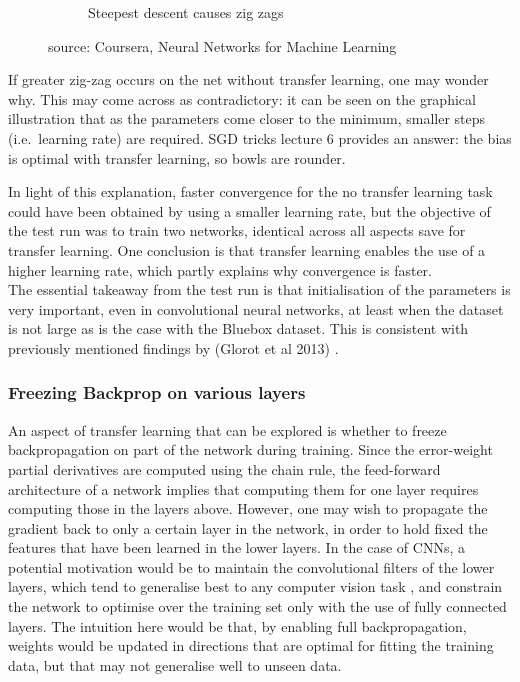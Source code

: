 \documentclass[a4paper,11pt]{article}
\begin{document}
\begin{figure}[h!]
\begin{subfigure}{.5\textwidth}
		\caption{Steepest descent causes zig zags}
	\end{subfigure}
	\caption{source: Coursera, Neural Networks for Machine Learning}
    \label{f37}
\end{figure}

If greater zig-zag occurs on the net without transfer learning, one may wonder why. This may come across as contradictory: it can be seen on the graphical illustration that as the parameters come closer to the minimum, smaller steps (i.e.\ learning rate) are required. SGD tricks lecture 6 provides an answer: the bias is optimal with transfer learning, so bowls are rounder.

In light of this explanation, faster convergence for the no transfer learning task could have been obtained by using a smaller learning rate, but the objective of the test run was to train two networks, identical across all aspects save for transfer learning. One conclusion is that transfer learning enables the use of a higher learning rate, which partly explains why convergence is faster. \\

The essential takeaway from the test run is that initialisation of the parameters is very important, even in convolutional neural networks, at least when the dataset is not large as is the case with the Bluebox dataset. This is consistent with previously mentioned findings by (Glorot et al 2013) \cite{rectifier}. \\


\subsubsection{Freezing Backprop on various layers}

An aspect of transfer learning that can be explored is whether to freeze backpropagation on part of the network during training. Since the error-weight partial derivatives are computed using the chain rule, the feed-forward architecture of a network implies that computing them for one layer requires computing those in the layers above. However, one may wish to propagate the gradient back to only a certain layer in the network, in order to hold fixed the features that have been learned in the lower layers. In the case of CNNs, a potential motivation would be to maintain the convolutional filters of the lower layers, which tend to generalise best to any computer vision task \cite{transfer-learning}, and constrain the network to optimise over the training set only with the use of fully connected layers. The intuition here would be that, by enabling full backpropagation, weights would be updated in directions that are optimal for fitting the training data, but that may not generalise well to unseen data. \\
\end{document}
